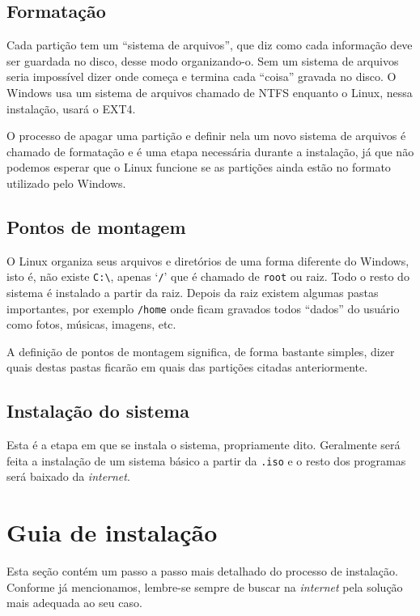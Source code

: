 \documentclass{handout_utfpr}
\begin{document}

\subsection{Formatação}
Cada partição tem um ``sistema de arquivos'', que diz como cada informação deve ser guardada no disco, desse modo organizando-o. Sem um sistema de arquivos seria impossível dizer onde começa e termina cada ``coisa'' gravada no disco. O Windows usa um sistema de arquivos chamado de NTFS enquanto o Linux, nessa instalação, usará o EXT4.

O processo de apagar uma partição e definir nela um novo sistema de arquivos é chamado de formatação e é uma etapa necessária durante a instalação, já que não podemos esperar que o Linux funcione se as partições ainda estão no formato utilizado pelo Windows.

\subsection{Pontos de montagem}
O Linux organiza seus arquivos e diretórios de uma forma diferente do Windows, isto é, não existe \texttt{C:\textbackslash}, apenas `\texttt{/}' que é chamado de \texttt{root} ou raiz. Todo o resto do sistema é instalado a partir da raiz. Depois da raiz existem algumas pastas importantes, por exemplo \texttt{/home} onde ficam gravados todos ``dados'' do usuário como fotos, músicas, imagens, etc.

A definição de pontos de montagem significa, de forma bastante simples, dizer quais destas pastas ficarão em quais das partições citadas anteriormente.

\subsection{Instalação do sistema}
Esta é a etapa em que se instala o sistema, propriamente dito. Geralmente será feita a instalação de um sistema básico a partir da \texttt{.iso} e o resto dos programas será baixado da \textit{internet}.

\section{Guia de instalação}\label{guia}
Esta seção contém um passo a passo mais detalhado do processo de instalação. Conforme já mencionamos, lembre-se sempre de buscar na \textit{internet} pela solução mais adequada ao seu caso.
\end{document}
